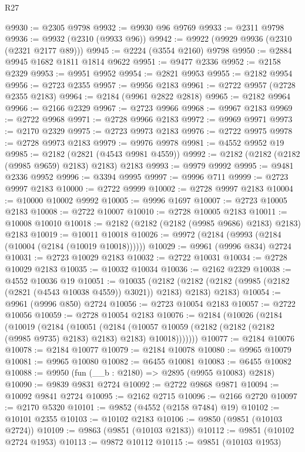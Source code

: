\begin{lexlean}{R27}
\begin{coremodule}
@9930 := @2305 @9798
@9932 := @9930 @96 @9769
@9933 := @2311 @9798
@9936 := @9932 (@2310 (@9933 @96))
@9942 := @9922 (@9929 @9936 (@2310 (@2321 @2177 @89)))
@9945 := @2224 (@3554 @2160) @9798
@9950 := @2884 @9945 @1682 @1811 @1814 @9622
@9951 := @9477 @2336
@9952 := @2158 @2329
@9953 := @9951 @9952
@9954 := @2821 @9953
@9955 := @2182 @9954
@9956 := @2723 @2355
@9957 := @9956 @2183
@9961 := @2722 @9957 (@2728 @2355 @2183)
@9964 := @2184 (@9961 @2822 @2818)
@9965 := @2182 @9964
@9966 := @2166 @2329
@9967 := @2723 @9966
@9968 := @9967 @2183
@9969 := @2722 @9968
@9971 := @2728 @9966 @2183
@9972 := @9969 @9971
@9973 := @2170 @2329
@9975 := @2723 @9973 @2183
@9976 := @2722 @9975
@9978 := @2728 @9973 @2183
@9979 := @9976 @9978
@9981 := @4552 @9952 @19
@9985 := @2182 (@2821 (@4543 @9981 @4559))
@9992 := @2182 (@2182 (@2182 (@9985 @9659) @2183) @2183) @2183
@9993 := @9979 @9992
@9995 := @9481 @2336 @9952
@9996 := @3394 @9995
@9997 := @9996 @711
@9999 := @2723 @9997 @2183
@10000 := @2722 @9999
@10002 := @2728 @9997 @2183
@10004 := @10000 @10002 @9992
@10005 := @9996 @1697
@10007 := @2723 @10005 @2183
@10008 := @2722 @10007
@10010 := @2728 @10005 @2183
@10011 := @10008 @10010
@10018 := @2182 (@2182 (@2182 (@9985 @9686) @2183) @2183) @2183
@10019 := @10011 @10018
@10026 := @9972 (@2184 (@9993 (@2184 (@10004 (@2184 (@10019 @10018))))))
@10029 := @9961 (@9996 @834) @2724
@10031 := @2723 @10029 @2183
@10032 := @2722 @10031
@10034 := @2728 @10029 @2183
@10035 := @10032 @10034
@10036 := @2162 @2329
@10038 := @4552 @10036 @19
@10051 := @10035
    (@2182 (@2182 (@2182 (@9985 (@2182 (@2821 (@4543 @10038 @4559)) @3021)) @2183) @2183) @2183)
@10054 := @9961 (@9996 @850) @2724
@10056 := @2723 @10054 @2183
@10057 := @2722 @10056
@10059 := @2728 @10054 @2183
@10076 := @2184
    (@10026
      (@2184
        (@10019
          (@2184
            (@10051
              (@2184
                (@10057 @10059 (@2182 (@2182 (@2182 (@9985 @9735) @2183) @2183) @2183) @10018)))))))
@10077 := @2184 @10076
@10078 := @2184 @10077
@10079 := @2184 @10078
@10080 := @9965 @10079
@10081 := @9965 @10080
@10082 := @6455 @10081
@10083 := @6455 @10082
@10088 := @9950 (fun (__b : @2180) => @2895 (@9955 @10083) @2818)
@10090 := @9839 @9831 @2724
@10092 := @2722 @9868 @9871
@10094 := @10092 @9841 @2724
@10095 := @2162 @2715
@10096 := @2166 @2720
@10097 := @2170 @5320
@10101 := @9852 (@4552 (@2158 @7484) @19)
@10102 := @10101 @2355
@10103 := @10102 @2183
@10106 := @9850 (@9851 (@10103 @2724))
@10109 := @9863 (@9851 (@10103 @2183))
@10112 := @9851 (@10102 @2724 @1953)
@10113 := @9872 @10112
@10115 := @9851 (@10103 @1953)

\end{coremodule}
\end{lexlean}
